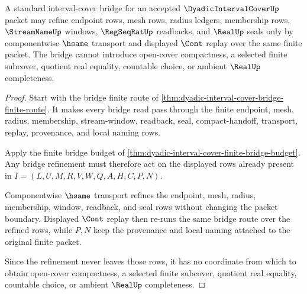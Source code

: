 \begin{theorem}
\label{thm:dyadic-interval-cover-bridge-refinement-boundary}
A standard interval-cover bridge for an accepted $\DyadicIntervalCoverUp$ packet may refine endpoint rows, mesh rows, radius ledgers, membership rows, $\StreamNameUp$ windows, $\RegSeqRatUp$ readbacks, and $\RealUp$ seals only by componentwise $\hsame$ transport and displayed $\Cont$ replay over the same finite packet. The bridge cannot introduce open-cover compactness, a selected finite subcover, quotient real equality, countable choice, or ambient $\RealUp$ completeness.
\end{theorem}
\begin{proof}
Start with the bridge finite route of \autoref{thm:dyadic-interval-cover-bridge-finite-route}. It makes every bridge read pass through the finite endpoint, mesh, radius, membership, stream-window, readback, seal, compact-handoff, transport, replay, provenance, and local naming rows.

Apply the finite bridge budget of \autoref{thm:dyadic-interval-cover-finite-bridge-budget}. Any bridge refinement must therefore act on the displayed rows already present in $I=(L,U,M,R,V,W,Q,A,H,C,P,N)$.

Componentwise $\hsame$ transport refines the endpoint, mesh, radius, membership, window, readback, and seal rows without changing the packet boundary. Displayed $\Cont$ replay then re-runs the same bridge route over the refined rows, while $P,N$ keep the provenance and local naming attached to the original finite packet.

Since the refinement never leaves those rows, it has no coordinate from which to obtain open-cover compactness, a selected finite subcover, quotient real equality, countable choice, or ambient $\RealUp$ completeness.
\end{proof}
